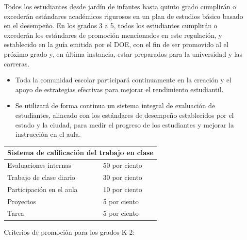 \documentclass[12pt,letterpaper]{article}
\begin{document}
Todos los estudiantes desde jardín de infantes hasta quinto grado cumplirán o excederán estándares académicos rigurosos en un plan de estudios básico basado en el desempeño. En los grados 3 a 5, todos los estudiantes cumplirán o excederán los estándares de promoción mencionados en este regulación, y establecido en la
guía emitida por el DOE, con el fin de ser promovido al el próximo grado y, en
última instancia, estar preparados para la universidad y las carreras.
\begin{itemize}
\item Toda la comunidad escolar participará continuamente en la creación y el apoyo de estrategias efectivas para mejorar el rendimiento estudiantil.
\item Se utilizará de forma continua un sistema integral de evaluación de estudiantes, alineado con los estándares de desempeño establecidos por el estado y la ciudad, para medir el progreso de los estudiantes y mejorar la instrucción en el aula.
\end{itemize}
\begin{table}[h]
\begin{center}
\begin{tabular}{@{}|l|l|@{}}
\toprule
\multicolumn{2}{|c|}{\textbf{Sistema de calificación del trabajo en clase}} \\ \midrule
Evaluaciones internas              & 50 por ciento          \\ \midrule
Trabajo de clase diario            & 30 por ciento          \\ \midrule
Participación en el aula           & 10 por ciento          \\ \midrule
Proyectos                          & 5 por ciento           \\ \midrule
Tarea                              & 5 por ciento           \\ \bottomrule
\end{tabular}
\end{center}
\end{table}
Criterios de promoción para los grados K-2:
\end{document}

